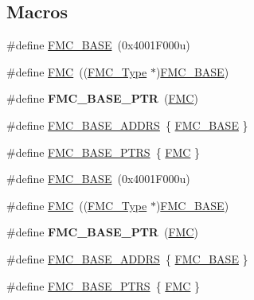 \subsection*{Macros}
\begin{DoxyCompactItemize}
\item 
\#define \hyperlink{group__FMC__Peripheral__Access__Layer_ga68a39e11ba4a19785d20a98954c7fc9e}{F\+M\+C\+\_\+\+B\+A\+SE}~(0x4001\+F000u)
\item 
\#define \hyperlink{group__FMC__Peripheral__Access__Layer_ga970254e6dadedc433f57d43709636664}{F\+MC}~((\hyperlink{structFMC__Type}{F\+M\+C\+\_\+\+Type} $\ast$)\hyperlink{group__FMC__Peripheral__Access__Layer_ga68a39e11ba4a19785d20a98954c7fc9e}{F\+M\+C\+\_\+\+B\+A\+SE})
\item 
\#define {\bfseries F\+M\+C\+\_\+\+B\+A\+S\+E\+\_\+\+P\+TR}~(\hyperlink{group__FMC__Peripheral__Access__Layer_ga970254e6dadedc433f57d43709636664}{F\+MC})\hypertarget{group__FMC__Peripheral__Access__Layer_ga0a740437b573e32e6b932bf729485fd9}{}\label{group__FMC__Peripheral__Access__Layer_ga0a740437b573e32e6b932bf729485fd9}

\item 
\#define \hyperlink{group__FMC__Peripheral__Access__Layer_ga37283f414971381846ab9da2c77096b3}{F\+M\+C\+\_\+\+B\+A\+S\+E\+\_\+\+A\+D\+D\+RS}~\{ \hyperlink{group__FMC__Peripheral__Access__Layer_ga68a39e11ba4a19785d20a98954c7fc9e}{F\+M\+C\+\_\+\+B\+A\+SE} \}
\item 
\#define \hyperlink{group__FMC__Peripheral__Access__Layer_ga7ad26eb02eedda3bb7e2863700c32017}{F\+M\+C\+\_\+\+B\+A\+S\+E\+\_\+\+P\+T\+RS}~\{ \hyperlink{group__FMC__Peripheral__Access__Layer_ga970254e6dadedc433f57d43709636664}{F\+MC} \}
\item 
\#define \hyperlink{group__FMC__Peripheral__Access__Layer_ga68a39e11ba4a19785d20a98954c7fc9e}{F\+M\+C\+\_\+\+B\+A\+SE}~(0x4001\+F000u)
\item 
\#define \hyperlink{group__FMC__Peripheral__Access__Layer_ga970254e6dadedc433f57d43709636664}{F\+MC}~((\hyperlink{structFMC__Type}{F\+M\+C\+\_\+\+Type} $\ast$)\hyperlink{group__FMC__Peripheral__Access__Layer_ga68a39e11ba4a19785d20a98954c7fc9e}{F\+M\+C\+\_\+\+B\+A\+SE})
\item 
\#define {\bfseries F\+M\+C\+\_\+\+B\+A\+S\+E\+\_\+\+P\+TR}~(\hyperlink{group__FMC__Peripheral__Access__Layer_ga970254e6dadedc433f57d43709636664}{F\+MC})\hypertarget{group__FMC__Peripheral__Access__Layer_ga0a740437b573e32e6b932bf729485fd9}{}\label{group__FMC__Peripheral__Access__Layer_ga0a740437b573e32e6b932bf729485fd9}

\item 
\#define \hyperlink{group__FMC__Peripheral__Access__Layer_ga37283f414971381846ab9da2c77096b3}{F\+M\+C\+\_\+\+B\+A\+S\+E\+\_\+\+A\+D\+D\+RS}~\{ \hyperlink{group__FMC__Peripheral__Access__Layer_ga68a39e11ba4a19785d20a98954c7fc9e}{F\+M\+C\+\_\+\+B\+A\+SE} \}
\item 
\#define \hyperlink{group__FMC__Peripheral__Access__Layer_ga7ad26eb02eedda3bb7e2863700c32017}{F\+M\+C\+\_\+\+B\+A\+S\+E\+\_\+\+P\+T\+RS}~\{ \hyperlink{group__FMC__Peripheral__Access__Layer_ga970254e6dadedc433f57d43709636664}{F\+MC} \}
\end{DoxyCompactItemize}
